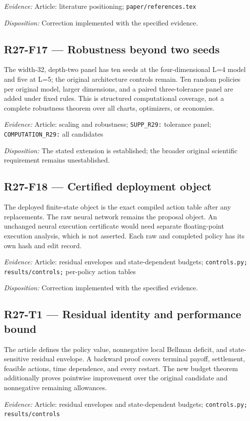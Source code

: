 \emph{Evidence:} Article: literature positioning; \nolinkurl{paper/references.tex}

\emph{Disposition:} Correction implemented with the specified evidence.
\subsection{R27-F17 --- Robustness beyond two seeds}
The width-32, depth-two panel has ten seeds at the four-dimensional L=4 model and five at L=5; the original architecture controls remain. Ten random policies per original model, larger dimensions, and a paired three-tolerance panel are added under fixed rules. This is structured computational coverage, not a complete robustness theorem over all charts, optimizers, or economies.

\emph{Evidence:} Article: scaling and robustness; \nolinkurl{SUPP_R29:} tolerance panel; \nolinkurl{COMPUTATION_R29:} all candidates

\emph{Disposition:} The stated extension is established; the broader original scientific requirement remains unestablished.
\subsection{R27-F18 --- Certified deployment object}
The deployed finite-state object is the exact compiled action table after any replacements. The raw neural network remains the proposal object. An unchanged neural execution certificate would need separate floating-point execution analysis, which is not asserted. Each raw and completed policy has its own hash and edit record.

\emph{Evidence:} Article: residual envelopes and state-dependent budgets; \nolinkurl{controls.py;} \nolinkurl{results/controls;} per-policy action tables

\emph{Disposition:} Correction implemented with the specified evidence.
\subsection{R27-T1 --- Residual identity and performance bound}
The article defines the policy value, nonnegative local Bellman deficit, and state-sensitive residual envelope. A backward proof covers terminal payoff, settlement, feasible actions, time dependence, and every restart. The new budget theorem additionally proves pointwise improvement over the original candidate and nonnegative remaining allowances.

\emph{Evidence:} Article: residual envelopes and state-dependent budgets; \nolinkurl{controls.py;} \nolinkurl{results/controls}

